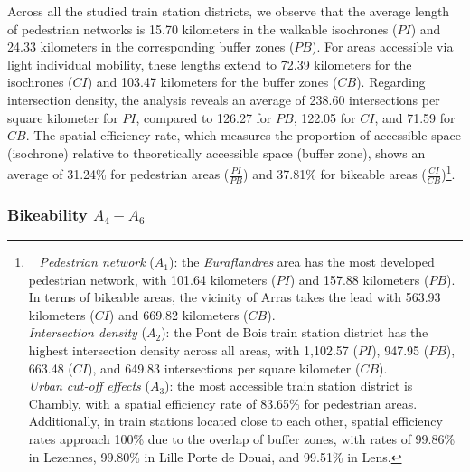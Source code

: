 \begin{refsegment}
Across all the studied train station districts, we observe that the average length of pedestrian networks is 15.70 kilometers in the walkable isochrones (\(PI\)) and 24.33 kilometers in the corresponding buffer zones (\(PB\)). For areas accessible via light individual mobility, these lengths extend to 72.39 kilometers for the isochrones (\(CI\)) and 103.47 kilometers for the buffer zones (\(CB\)). Regarding intersection density, the analysis reveals an average of 238.60 intersections per square kilometer for \(PI\), compared to 126.27 for \(PB\), 122.05 for \(CI\), and 71.59 for \(CB\). The spatial efficiency rate, which measures the proportion of accessible space (isochrone) relative to theoretically accessible space (buffer zone), shows an average of 31.24\% for pedestrian areas (\(\frac{PI}{PB}\)) and 37.81\% for bikeable areas (\(\frac{CI}{CB}\))\footnote{~
    \textsl{Pedestrian network} (\(A_{1}\)): the \textsl{Euraflandres} area has the most developed pedestrian network, with 101.64 kilometers (\(PI\)) and 157.88 kilometers (\(PB\)). In terms of bikeable areas, the vicinity of Arras takes the lead with 563.93 kilometers (\(CI\)) and 669.82 kilometers (\(CB\)).
    \\
    \textsl{Intersection density} (\(A_{2}\)): the Pont de Bois train station district has the highest intersection density across all areas, with 1,102.57 (\(PI\)), 947.95 (\(PB\)), 663.48 (\(CI\)), and 649.83 intersections per square kilometer (\(CB\)).
    \\
    \textsl{Urban cut-off effects} (\(A_{3}\)): the most accessible train station district is Chambly, with a spatial efficiency rate of 83.65\% for pedestrian areas. Additionally, in train stations located close to each other, spatial efficiency rates approach 100\% due to the overlap of buffer zones, with rates of 99.86\% in Lezennes, 99.80\% in Lille Porte de Douai, and 99.51\% in Lens.
}.

\subsubsection*{Bikeability \(A_{4} - A_{6}\)
    \label{chap6:indicateurs-accessibility-cyclabilite}
    }


\end{refsegment}
